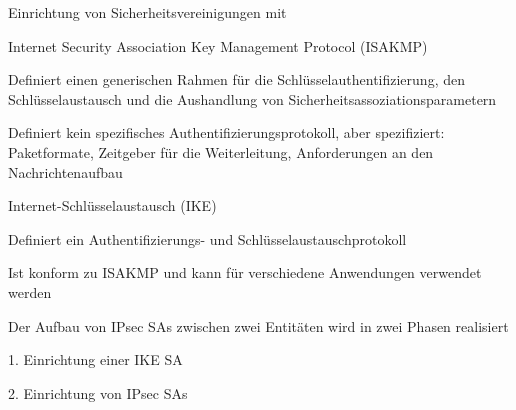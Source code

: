 \documentclass[a4paper]{article}
\begin{document}
\begin{multicols}{3}
      Einrichtung von Sicherheitsvereinigungen mit
      \begin{itemize*}
            \item Internet Security Association Key Management Protocol (ISAKMP)
            \begin{itemize*}
                  \item Definiert einen generischen Rahmen für die Schlüsselauthentifizierung, den Schlüsselaustausch und die Aushandlung von Sicherheitsassoziationsparametern
                  \item Definiert kein spezifisches Authentifizierungsprotokoll, aber spezifiziert: Paketformate, Zeitgeber für die Weiterleitung, Anforderungen an den Nachrichtenaufbau
            \end{itemize*}
            \item Internet-Schlüsselaustausch (IKE)
            \begin{itemize*}
                  \item Definiert ein Authentifizierungs- und Schlüsselaustauschprotokoll
                  \item Ist konform zu ISAKMP und kann für verschiedene Anwendungen verwendet werden
                  \item Der Aufbau von IPsec SAs zwischen zwei Entitäten wird in zwei Phasen realisiert
                  \item 1. Einrichtung einer IKE SA %
                  \item 2. Einrichtung von IPsec SAs
            \end{itemize*}
      \end{itemize*}


\end{multicols}
\end{document}
